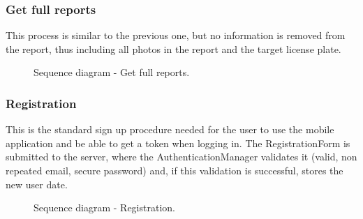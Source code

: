 \subsubsection{Get full reports}
This process is similar to the previous one, but no information is removed from the report, thus including all photos in the report and the target license plate.

\begin{figure}[H]
    \centering
    \caption{\label{fig:sequence-get-full-reports}Sequence diagram - Get full reports.}
\end{figure}

\subsubsection{Registration}
This is the standard sign up procedure needed for the user to use the mobile application and be able to get a token when logging in. The RegistrationForm is submitted to the server, where the AuthenticationManager validates it (valid, non repeated email, secure password) and, if this validation is successful, stores the new user date.

\begin{figure}[H]
    \centering
    \caption{\label{fig:sequence-registration}Sequence diagram - Registration.}
\end{figure}

